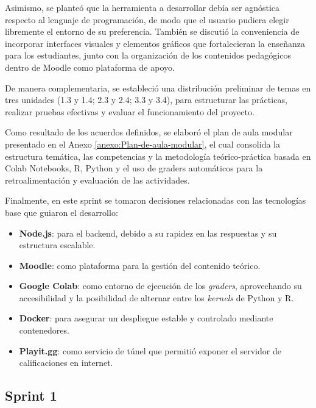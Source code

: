 \documentclass[letter,oneside,12pt,spanish]{report}
\begin{document}
Asimismo, se planteó que la herramienta a desarrollar debía ser agnóstica respecto al lenguaje de programación, de modo que el usuario pudiera elegir libremente el entorno de su preferencia. También se discutió la conveniencia de incorporar interfaces visuales y elementos gráficos que fortalecieran la enseñanza para los estudiantes, junto con la organización de los contenidos pedagógicos dentro de Moodle como plataforma de apoyo.  

De manera complementaria, se estableció una distribución preliminar de temas en tres unidades (1.3 y 1.4; 2.3 y 2.4; 3.3 y 3.4), para estructurar las prácticas, realizar pruebas efectivas y evaluar el funcionamiento del proyecto.  

Como resultado de los acuerdos definidos, se elaboró el plan de aula modular presentado en el Anexo \ref{anexo:Plan-de-aula-modular}, el cual consolida la estructura temática, las competencias y la metodología teórico-práctica basada en Colab Notebooks, R, Python y el uso de graders automáticos para la retroalimentación y evaluación de las actividades.

Finalmente, en este sprint se tomaron decisiones relacionadas con las tecnologías base que guiaron el desarrollo:  

\begin{itemize}
	\item \textbf{Node.js}: para el backend, debido a su rapidez en las respuestas y su estructura escalable.  
	\item \textbf{Moodle}: como plataforma para la gestión del contenido teórico.  
	\item \textbf{Google Colab}: como entorno de ejecución de los \textit{graders}, aprovechando su accesibilidad y la posibilidad de alternar entre los \textit{kernels} de Python y R.  
	\item \textbf{Docker}: para asegurar un despliegue estable y controlado mediante contenedores.  
	\item \textbf{Playit.gg}: como servicio de túnel que permitió exponer el servidor de calificaciones en internet.  
\end{itemize}

\subsection{Sprint 1}
\end{document}
